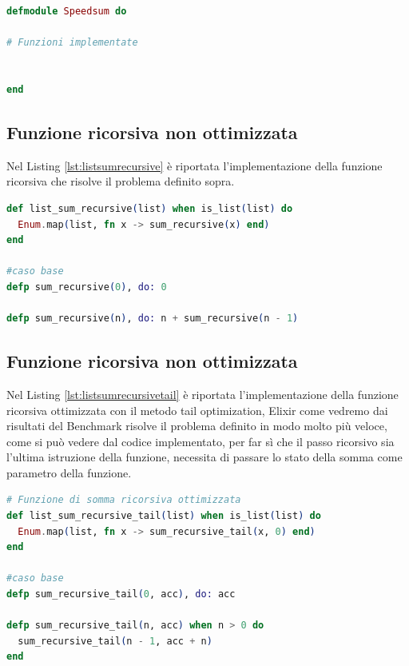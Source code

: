 \begin{lstlisting}[language=elixir,captionpos=b,
	caption={Modulo di riferimento},
	label={lst:speedSum}]
defmodule Speedsum do

# Funzioni implementate


end


\end{lstlisting}


\subsection{Funzione ricorsiva non ottimizzata}
Nel Listing \ref{lst:listsumrecursive} è riportata l'implementazione
della funzione ricorsiva che risolve il problema definito sopra.

\begin{lstlisting}[language=elixir,captionpos=b,
	caption={Funzione list\_sum\_recursive()},
	label={lst:listsumrecursive}]
def list_sum_recursive(list) when is_list(list) do
  Enum.map(list, fn x -> sum_recursive(x) end)
end

#caso base
defp sum_recursive(0), do: 0

defp sum_recursive(n), do: n + sum_recursive(n - 1)
\end{lstlisting}

\subsection{Funzione ricorsiva non ottimizzata}
Nel Listing \ref{lst:listsumrecursivetail} è riportata l'implementazione
della funzione ricorsiva ottimizzata con il metodo tail optimization,
Elixir come vedremo dai risultati del Benchmark risolve il problema
definito in modo molto più veloce, come si può vedere dal codice
implementato, per far sì che il passo ricorsivo sia l'ultima
istruzione della funzione, necessita di passare lo stato della
somma come parametro della funzione.

\begin{lstlisting}[language=elixir,captionpos=b,
	caption={Funzione list\_sum\_recursive\_tail()},
	label={lst:listsumrecursivetail}]
# Funzione di somma ricorsiva ottimizzata
def list_sum_recursive_tail(list) when is_list(list) do
  Enum.map(list, fn x -> sum_recursive_tail(x, 0) end)
end
  
#caso base
defp sum_recursive_tail(0, acc), do: acc

defp sum_recursive_tail(n, acc) when n > 0 do
  sum_recursive_tail(n - 1, acc + n)
end
\end{lstlisting}


